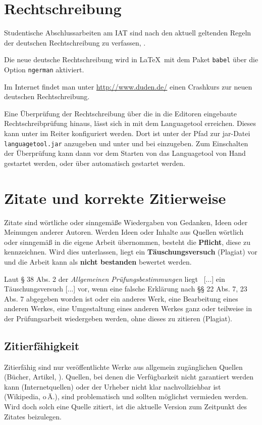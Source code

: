 \section{Rechtschreibung}

Studentische Abschlussarbeiten am IAT sind nach den aktuell geltenden Regeln der deutschen Rechtschreibung zu verfassen, \cite{Duden}.

Die neue deutsche Rechtschreibung wird in \LaTeX\ mit dem Paket \verb|babel| über die Option \verb|ngerman| aktiviert.

Im Internet findet man unter \url{http://www.duden.de/} einen Crashkurs zur neuen deutschen Rechtschreibung.

Eine Überprüfung der Rechtschreibung über die in die Editoren eingebaute Rechtschreibprüfung hinaus, lässt sich in \Texstudio{} mit dem Languagetool erreichen.
Dieses kann unter \Texstudio{} im Reiter  konfiguriert werden.
Dort ist unter  der Pfad zur jar-Datei \texttt{languagetool.jar} anzugeben und unter   und bei   einzugeben.
Zum Einschalten der Überprüfung kann dann vor dem Starten von \Texstudio{} das Languagetool von Hand gestartet werden, oder über  automatisch gestartet werden.


\section{Zitate und korrekte Zitierweise}
\label{sec:Latex-Zitieren}
Zitate sind wörtliche oder sinngemäße Wiedergaben von Gedanken, Ideen oder Meinungen anderer Autoren.
Werden Ideen oder Inhalte aus Quellen wörtlich oder sinngemäß in die eigene Arbeit übernommen, besteht die \textbf{Pflicht}, diese zu kennzeichnen.
Wird dies unterlassen, liegt ein \textbf{Täuschungsversuch} (Plagiat) vor und die Arbeit kann als \textbf{nicht bestanden} bewertet werden.

Laut § 38 Abs. 2 der \emph{Allgemeinen Prüfungsbestimmungen} liegt \glqq\ [...] ein Täuschungsversuch [...] vor, wenn eine falsche Erklärung nach §§ 22 Abs. 7, 23 Abs. 7 abgegeben worden ist oder ein anderes Werk, eine Bearbeitung eines anderen Werkes, eine Umgestaltung eines anderen Werkes ganz oder teilweise in der Prüfungsarbeit wiedergeben werden, ohne dieses zu zitieren (Plagiat).\grqq~\cite{APB}

\subsection*{Zitierfähigkeit}
Zitierfähig sind nur veröffentlichte Werke aus allgemein zugänglichen Quellen (Bücher, Artikel, \etc).
Quellen, bei denen die Verfügbarkeit nicht garantiert werden kann (Internetquellen) oder der Urheber nicht klar nachvollziehbar ist (Wikipedia, o\,Ä.), sind problematisch und sollten möglichst vermieden werden.
Wird doch solch eine Quelle zitiert, ist die aktuelle Version zum Zeitpunkt des Zitates beizulegen.

